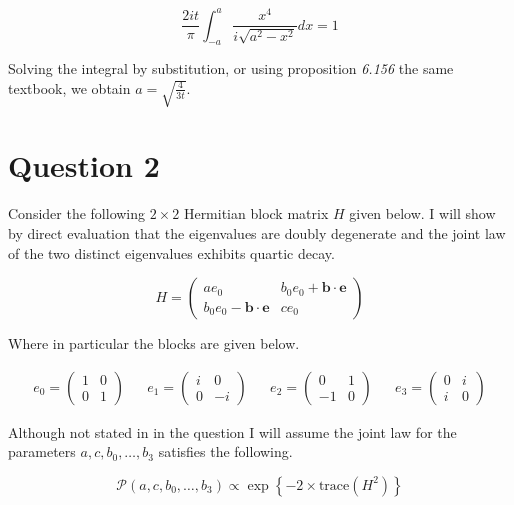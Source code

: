\documentclass{article}
\begin{document}
\begin{equation}
	\frac{2it}{\pi} \int_{-a}^a \frac{x^4}{i \sqrt{a^2 - x^2}} dx = 1 
\end{equation}

Solving the integral by substitution, or using proposition \textit{6.156} the same textbook, we obtain  $a = \sqrt{\frac{4}{3t}}$. 

\section*{Question 2}

Consider the following $2 \times 2$ Hermitian block matrix $H$ given below. I will show by direct evaluation that the eigenvalues are doubly degenerate and the joint law of the two distinct eigenvalues exhibits quartic decay. 

\begin{equation}
	H = \begin{pmatrix}
a e_0 & b_0 e_0 + \mathbf{b \cdot e} \\ 
b_0 e_0 - \mathbf{b \cdot e} & c e_0 
\end{pmatrix}
\label{equation: H}
\end{equation}

Where in particular the blocks are given below. 

\begin{align}
e_0 = \begin{pmatrix}
1 & 0\\ 
0 & 1
\end{pmatrix} && e_1 = \begin{pmatrix}
i & 0\\ 
0 & -i
\end{pmatrix} && e_2 = \begin{pmatrix}
0 & 1\\ 
-1 & 0
\end{pmatrix} && e_3 = \begin{pmatrix}
0 & i\\ 
i & 0
\end{pmatrix}
\end{align}

Although not stated in in the question I will assume the joint law for the parameters $a, c, b_0, \dots, b_3$ satisfies the following. 

\begin{equation}
	\mathcal{P} \left( a, c, b_0, \dots, b_3 \right ) \propto \exp \left \{ -2 \times \text{trace} \left ( H^2 \right ) \right \} 
	\label{equation: H law}
\end{equation}
\end{document}
